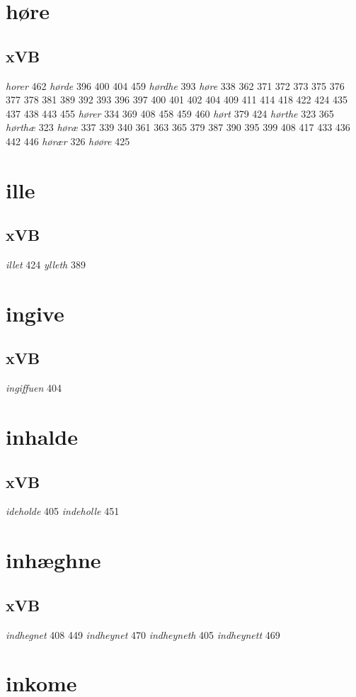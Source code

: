 \documentclass[a4paper,twocolumn]{article}
\begin{document}
\section{høre}
\label{sec:orgd239227}
\subsection{xVB}
\label{sec:org1d37329}
\emph{horer} 462 \emph{hørde} 396 400 404 459 \emph{hørdhe} 393 \emph{høre} 338 362 371 372 373 375 376 377 378 381 389 392 393 396 397 400 401 402 404 409 411 414 418 422 424 435 437 438 443 455 \emph{hører} 334 369 408 458 459 460 \emph{hørt} 379 424 \emph{hørthe} 323 365 \emph{hørthæ} 323 \emph{høræ} 337 339 340 361 363 365 379 387 390 395 399 408 417 433 436 442 446 \emph{hørær} 326 \emph{høøre} 425 
\section{ille}
\label{sec:orga600b63}
\subsection{xVB}
\label{sec:orgb84855d}
\emph{illet} 424 \emph{ylleth} 389 
\section{ingive}
\label{sec:orgac48d85}
\subsection{xVB}
\label{sec:org608a0c4}
\emph{ingiffuen} 404 
\section{inhalde}
\label{sec:orgcac7c02}
\subsection{xVB}
\label{sec:orgb06da7b}
\emph{ideholde} 405 \emph{indeholle} 451 
\section{inhæghne}
\label{sec:orge600cdb}
\subsection{xVB}
\label{sec:org7abee16}
\emph{indhegnet} 408 449 \emph{indheynet} 470 \emph{indheyneth} 405 \emph{indheynett} 469 
\section{inkome}
\label{sec:org1f430f8}
\end{document}
